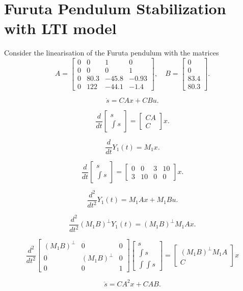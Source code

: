 \documentclass[10pt,letterpaper,twocolumn]{scrartcl}
\begin{document}
\section{Furuta Pendulum Stabilization with LTI model}

Consider the linearisation of the Furuta pendulum with the matrices
\[
    A = \begin{bmatrix} 0 & 0 & 1 & 0 \\ 0 & 0 & 0 & 1 \\ 0 & 80.3 & -45.8 & -0.93 \\ 0 & 122 & -44.1 & -1.4 \end{bmatrix}, \quad
    B = \begin{bmatrix} 0 \\ 0 \\ 83.4 \\ 80.3 \end{bmatrix}
.\]

\[
    \dot{s} = C A x + C B u 
.\]

\[
    \frac{d}{dt} \begin{bmatrix} s \\ \int s \end{bmatrix}  = \begin{bmatrix} CA \\ C \end{bmatrix}  x
.\]

\[
 \frac{d}{dt} Y_1(t) = M_1 x   
.\]

\[
    \frac{d}{dt} \begin{bmatrix} s \\ \int s \end{bmatrix}= \begin{bmatrix} 0 & 0 & 3 & 10 \\ 3 & 10 & 0 & 0 \end{bmatrix}  x   
.\]

\[
 \frac{d^2}{dt^2} Y_1(t) = M_1 A x + M_1 B u
.\]

\[
    \frac{d^2}{dt^2} (M_1 B)^\perp Y_1(t) = (M_1 B)^\perp M_1 A x 
.\]

\begin{equation}
    \frac{d^2}{dt^2} \begin{bmatrix} (M_1 B)^\perp & 0 & 0 \\ 0 & (M_1 B)^\perp & 0 \\ 0 & 0 & 1 \end{bmatrix}   \begin{bmatrix} s \\ \int s \\ \int \int s \end{bmatrix} = \begin{bmatrix} (M_1 B)^\perp M_1 A \\ C \end{bmatrix}   x 
\end{equation}

\[
    \ddot{s} = C A^2 x + C A B
.\]
\end{document}
